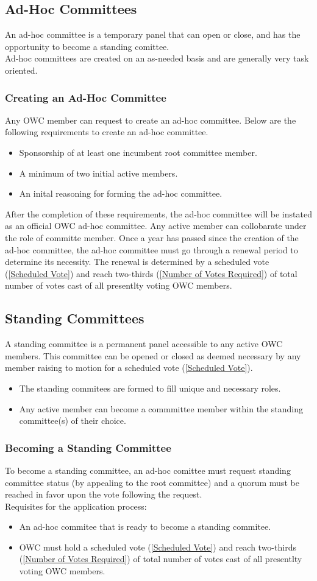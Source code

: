 \documentclass{article}
\newcommand{\asection}[1]{\subsection{#1} \label{#1}}
\newcommand{\asubsection}[1]{\subsubsection{#1} \label{#1}}
\begin{document}
\asection{Ad-Hoc Committees}
An ad-hoc committee is a temporary panel that can open or close, and has the opportunity to become a standing comittee.\\
Ad-hoc committees are created on an as-needed basis and are generally very task oriented.

\asubsection{Creating an Ad-Hoc Committee}
Any OWC member can request to create an ad-hoc committee. Below are the following requirements to create an ad-hoc committee.
\begin{itemize}
	\item Sponsorship of at least one incumbent root committee member.
	\item A minimum of two initial active members. 
	\item An inital reasoning for forming the ad-hoc committee.
\end{itemize}
After the completion of these requirements, the ad-hoc committee will be instated as an official OWC ad-hoc committee.
Any active member can collobarate under the role of committe member. Once a year has passed since the creation of the ad-hoc committee, the ad-hoc committee must go through a renewal period to determine its necessity. The renewal is determined by a scheduled vote (\ref{Scheduled Vote}) and reach two-thirds (\ref{Number of Votes Required}) of total number of votes cast of all presentlty voting OWC members.

\asection{Standing Committees}
A standing committee is a permanent panel accessible to any active OWC members. This committee can be opened or closed as deemed necessary by any member raising to motion for a scheduled vote (\ref{Scheduled Vote}). 
\begin{itemize}
	\item The standing commitees are formed to fill unique and necessary roles.
	\item Any active member can become a commmittee member within the standing committee(s) of their choice. 
\end{itemize}
\asubsection{Becoming a Standing Committee}
To become a standing committee, an ad-hoc comittee must request standing committee status (by appealing to the root committee) and a quorum must be reached in favor upon the vote following the request. \\
Requisites for the application process:
\begin{itemize}
	\item An ad-hoc commitee that is ready to become a standing commitee.
	\item OWC must hold a scheduled vote (\ref{Scheduled Vote}) and reach two-thirds (\ref{Number of Votes Required}) of total number of votes cast of all presentlty voting OWC members.
\end{itemize}
\end{document}
